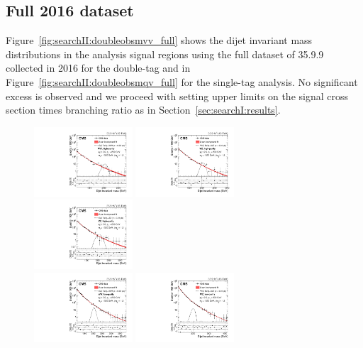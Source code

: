 \subsection{Full 2016 dataset}   
\label{sec:searchII:brg17001res}
Figure~\ref{fig:searchII:doubleobsmvv_full} shows the dijet invariant mass distributions in the analysis signal regions using the full dataset of 35.9.9 \fbinv collected in 2016 for the double-tag and in Figure~\ref{fig:searchII:doubleobsmqv_full} for the single-tag analysis. No significant excess is observed and we proceed with setting upper limits on the signal cross section times branching ratio as in Section~\ref{sec:searchI:results}.\newline
\begin{figure}[h!]
\centering
\includegraphics[width=0.327\textwidth]{figures/analysis/search2/B2G-17-001/Figure_004-a.pdf}
\includegraphics[width=0.327\textwidth]{figures/analysis/search2/B2G-17-001/Figure_004-c.pdf}
\includegraphics[width=0.327\textwidth]{figures/analysis/search2/B2G-17-001/Figure_004-e.pdf}\\
\includegraphics[width=0.327\textwidth]{figures/analysis/search2/B2G-17-001/Figure_004-b.pdf}
\includegraphics[width=0.327\textwidth]{figures/analysis/search2/B2G-17-001/Figure_004-d.pdf}

\end{figure}
